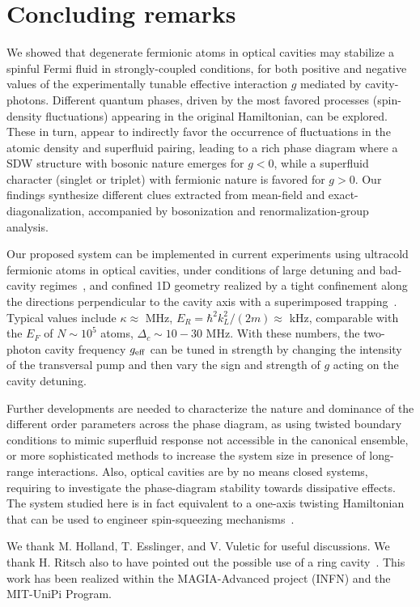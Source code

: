 \documentclass[pra,aps,superscriptaddress,twocolumn]{revtex4}
\begin{document}
\section{Concluding remarks}\label{sec:conclusions}
We showed that degenerate fermionic atoms in optical cavities may stabilize a spinful Fermi fluid
in strongly-coupled conditions, for both positive and negative values
of the experimentally tunable effective interaction $g$ mediated by cavity-photons.
Different quantum phases, driven by the most favored processes (spin-density fluctuations) appearing in the original Hamiltonian, can be explored.
These in turn, appear to indirectly favor the occurrence of fluctuations
in the atomic density and superfluid pairing, leading to a rich phase diagram
where a SDW structure with bosonic nature emerges for $g<0$, while a superfluid character (singlet or triplet)
with fermionic nature is favored for $g>0$.
Our findings synthesize different clues extracted from mean-field and exact-diagonalization,
accompanied by bosonization and renormalization-group analysis.

Our proposed system can be implemented in current experiments using ultracold fermionic atoms in optical cavities,
under conditions of large detuning and bad-cavity regimes~\cite{EsslingerReview}, and confined 1D geometry realized by
a tight confinement along the directions perpendicular to the cavity axis with a superimposed trapping~\cite{EsslingerOpto}.
Typical values include $\kappa\approx$ MHz, $E_R=\hbar^2 k_L^2/(2m)\approx$ kHz, comparable with the $E_F$
of $N \sim 10^5$ atoms, $\Delta_c \sim 10-30$ MHz. With these numbers, the two-photon cavity frequency $g_{\rm eff}$ can be tuned in strength
by changing the intensity of the transversal pump and then vary the sign and strength of $g$ acting on the cavity detuning.

Further developments are needed to characterize the nature and dominance of the different order parameters
across the phase diagram, as using twisted boundary conditions to mimic superfluid response
not accessible in the canonical ensemble, or more sophisticated methods to increase the system size
in presence of long-range interactions. Also, optical cavities are by no means closed systems,
requiring to investigate the phase-diagram stability towards dissipative effects.
The system studied here is in fact equivalent to a one-axis twisting Hamiltonian
that can be used to engineer spin-squeezing mechanisms~\cite{SquezRev}.

\acknowledgments
We thank M. Holland, T. Esslinger, and V. Vuletic for useful discussions.
We thank H. Ritsch also to have pointed out the possible use of a ring cavity~\cite{refnoteHelmut}.
This work has been realized within the MAGIA-Advanced project (INFN) and the MIT-UniPi Program.
\end{document}
